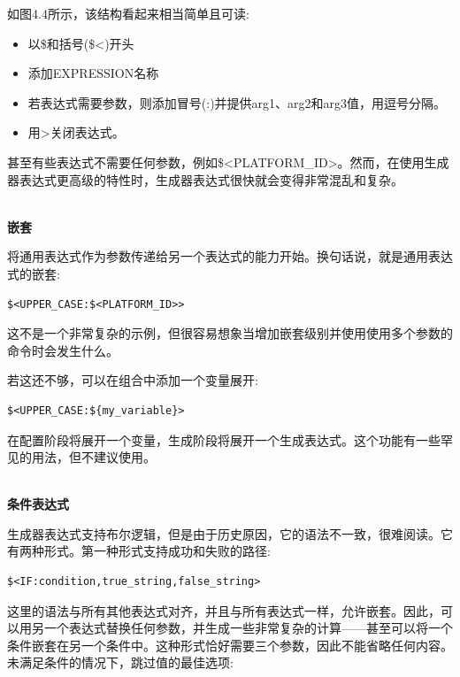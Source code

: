 如图4.4所示，该结构看起来相当简单且可读:

\begin{itemize}
\item 
以\$和括号(\$<)开头

\item 
添加EXPRESSION名称

\item 
若表达式需要参数，则添加冒号(:)并提供arg1、arg2和arg3值，用逗号分隔。

\item 
用>关闭表达式。
\end{itemize}

甚至有些表达式不需要任何参数，例如\$<PLATFORM\_ID>。然而，在使用生成器表达式更高级的特性时，生成器表达式很快就会变得非常混乱和复杂。

\hspace*{\fill} \\ %
\noindent
\textbf{嵌套}

将通用表达式作为参数传递给另一个表达式的能力开始。换句话说，就是通用表达式的嵌套:

\begin{lstlisting}[style=styleCMake]
$<UPPER_CASE:$<PLATFORM_ID>>
\end{lstlisting}

这不是一个非常复杂的示例，但很容易想象当增加嵌套级别并使用使用多个参数的命令时会发生什么。

若这还不够，可以在组合中添加一个变量展开:

\begin{lstlisting}[style=styleCMake]
$<UPPER_CASE:${my_variable}>
\end{lstlisting}

在配置阶段将展开一个变量，生成阶段将展开一个生成表达式。这个功能有一些罕见的用法，但不建议使用。

\hspace*{\fill} \\ %
\noindent
\textbf{条件表达式}

生成器表达式支持布尔逻辑，但是由于历史原因，它的语法不一致，很难阅读。它有两种形式。第一种形式支持成功和失败的路径:

\begin{lstlisting}[style=styleCMake]
$<IF:condition,true_string,false_string>
\end{lstlisting}

这里的语法与所有其他表达式对齐，并且与所有表达式一样，允许嵌套。因此，可以用另一个表达式替换任何参数，并生成一些非常复杂的计算——甚至可以将一个条件嵌套在另一个条件中。这种形式恰好需要三个参数，因此不能省略任何内容。未满足条件的情况下，跳过值的最佳选项:


